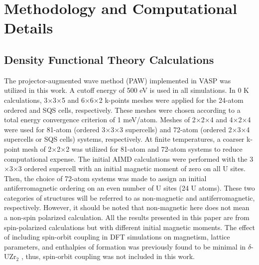 \documentclass[preprint,12pt]{elsarticle}
\begin{document}
\section{Methodology and Computational Details}

\subsection{Density Functional Theory Calculations}
The projector-augmented wave method (PAW) \cite{blochl_projector_1994} implemented in VASP \cite{kresse_ab_1993,kresse_efficient_1996} was utilized in this work. A cutoff energy of 500 eV is used in all simulations. In 0 K calculations, 3$\times$3$\times$5 and 6$\times$6$\times$2 k-points meshes were applied for the 24-atom ordered and SQS cells, respectively. These meshes were chosen according to a total energy convergence criterion of 1 meV/atom. Meshes of 2$\times$2$\times$4 and 4$\times$2$\times$4 were used for 81-atom (ordered 3$\times$3$\times$3 supercells) and 72-atom (ordered 2$\times$3$\times$4 supercells or SQS cells) systems, respectively. At finite temperatures, a coarser k-point mesh of 2$\times$2$\times$2 was utilized for 81-atom and 72-atom systems to reduce computational expense. The initial AIMD calculations were performed with the 3$\times$3$\times$3 ordered supercell with an initial magnetic moment of zero on all U sites. Then, the choice of 72-atom systems was made to assign an initial antiferromagnetic ordering on an even number of U sites (24 U atoms). These two categories of structures will be referred to as non-magnetic and antiferromagnetic, respectively. However, it should be noted that non-magnetic here does not mean a non-spin polarized calculation. All the results presented in this paper are from spin-polarized calculations but with different initial magnetic moments.
The effect of including spin-orbit coupling in DFT simulations on magnetism, lattice parameters, and enthalpies of formation was previously found to be minimal in $\delta$-UZr$_2$ \cite{xie_correlation_2013, ghosh_chemical_2021}, thus, spin-orbit coupling was not included in this work.
\end{document}

